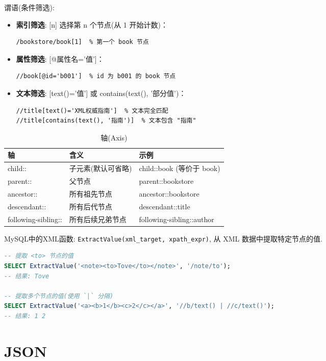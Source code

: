 谓语(条件筛选):
\begin{itemize}
    \item \textbf{索引筛选}: [n] 选择第 n 个节点(从 1 开始计数)：
    \begin{verbatim}
/bookstore/book[1]  % 第一个 book 节点
    \end{verbatim}
    \item \textbf{属性筛选}: [@属性名='值']：
    \begin{verbatim}
//book[@id='b001']  % id 为 b001 的 book 节点
    \end{verbatim}
    \item \textbf{文本筛选}: [text()='值'] 或 contains(text(), '部分值')：
    \begin{verbatim}
//title[text()='XML权威指南']  % 文本完全匹配
//title[contains(text(), '指南')]  % 文本包含 "指南"
    \end{verbatim}
\end{itemize}

\begin{table}[H]
    \centering\begin{tabular}{|l|l|l|}
        \hline
        \textbf{轴} & \textbf{含义} & \textbf{示例} \\
        \hline
        child:: & 子元素(默认可省略) & child::book (等价于 book) \\
        \hline
        parent:: & 父节点 & parent::bookstore \\
        \hline
        ancestor:: & 所有祖先节点 & ancestor::bookstore \\
        \hline
        descendant:: & 所有后代节点 & descendant::title \\
        \hline
        following-sibling:: & 所有后续兄弟节点 & following-sibling::author \\
        \hline
    \end{tabular}
    \caption{轴(Axis)}
\end{table}


MySQL中的XML函数: \verb|ExtractValue(xml_target, xpath_expr)|, 从 XML 数据中提取特定节点的值.
\begin{lstlisting}[language=SQL]
-- 提取 <to> 节点的值
SELECT ExtractValue('<note><to>Tove</to></note>', '/note/to');
-- 结果: Tove

-- 提取多个节点的值(使用 `|` 分隔)
SELECT ExtractValue('<a><b>1</b><c>2</c></a>', '//b/text() | //c/text()');
-- 结果: 1 2
\end{lstlisting}

\section{JSON}

